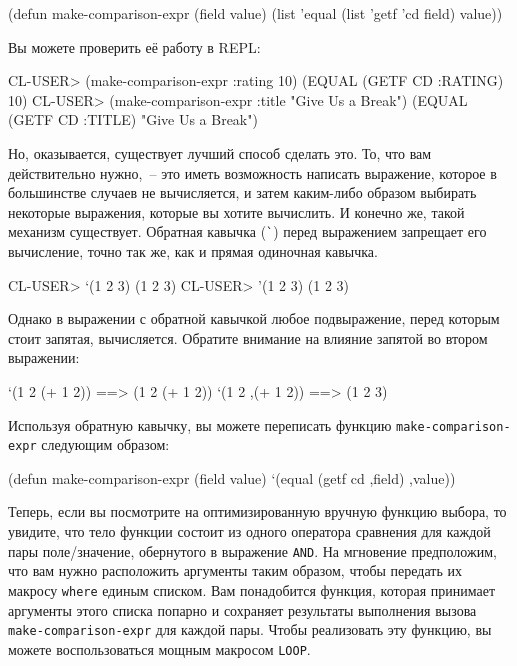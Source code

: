 \begin{myverb}
(defun make-comparison-expr (field value)
  (list 'equal (list 'getf 'cd field) value))
\end{myverb}

Вы можете проверить её работу в REPL:

\begin{myverb}
CL-USER> (make-comparison-expr :rating 10)
(EQUAL (GETF CD :RATING) 10)
CL-USER> (make-comparison-expr :title "Give Us a Break")
(EQUAL (GETF CD :TITLE) "Give Us a Break")
\end{myverb}

Но, оказывается, существует лучший способ сделать это. То, что вам действительно нужно,~--
это иметь возможность написать выражение, которое в большинстве случаев не вычисляется, и
затем каким-либо образом выбирать некоторые выражения, которые вы хотите вычислить. И
конечно же, такой механизм существует. Обратная кавычка (\lstinline{`}) перед выражением
запрещает его вычисление, точно так же, как и прямая одиночная кавычка.

\begin{myverb}
CL-USER> `(1 2 3)
(1 2 3)
CL-USER> '(1 2 3)
(1 2 3)
\end{myverb}

Однако в выражении с обратной кавычкой любое подвыражение, перед которым стоит запятая,
вычисляется. Обратите внимание на влияние запятой во втором выражении:

\begin{myverb}
`(1 2 (+ 1 2))  ==> (1 2 (+ 1 2))
`(1 2 ,(+ 1 2)) ==> (1 2 3)
\end{myverb}

Используя обратную кавычку, вы можете переписать функцию \lstinline{make-comparison-expr} следующим образом:

\begin{myverb}
(defun make-comparison-expr (field value)
  `(equal (getf cd ,field) ,value))
\end{myverb}

Теперь, если вы посмотрите на оптимизированную вручную функцию выбора, то увидите, что
тело функции состоит из одного оператора сравнения для каждой пары поле/значение,
обернутого в выражение \lstinline{AND}. На мгновение предположим, что вам нужно расположить
аргументы таким образом, чтобы передать их макросу \lstinline{where} единым списком. Вам
понадобится функция, которая принимает аргументы этого списка попарно и сохраняет
результаты выполнения вызова \lstinline{make-comparison-expr} для каждой пары. Чтобы
реализовать эту функцию, вы можете воспользоваться мощным макросом \lstinline{LOOP}.

